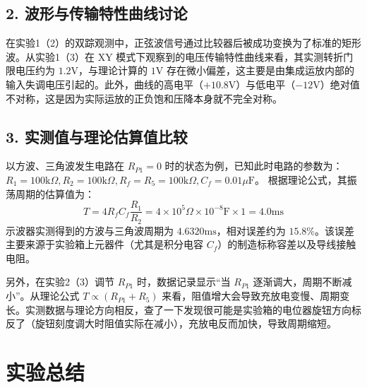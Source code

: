 \documentclass[10.5pt]{config}
\begin{document}
\subsection*{2. 波形与传输特性曲线讨论}
在实验1（2）的双踪观测中，正弦波信号通过比较器后被成功变换为了标准的矩形波。从实验1（3）在 XY 模式下观察到的电压传输特性曲线来看，其实测转折门限电压约为 $1.2\text{V}$，与理论计算的 $1\text{V}$ 存在微小偏差，这主要是由集成运放内部的输入失调电压引起的。此外，曲线的高电平（$+10.8\text{V}$）与低电平（$-12\text{V}$）绝对值不对称，这是因为实际运放的正负饱和压降本身就不完全对称。

\subsection*{3. 实测值与理论估算值比较}
以方波、三角波发生电路在 $R_{P1}=0$ 时的状态为例，已知此时电路的参数为：$R_1=100\text{k}\Omega, R_2=100\text{k}\Omega, R_f = R_5 = 100\text{k}\Omega, C_f = 0.01\mu\text{F}$。
根据理论公式，其振荡周期的估算值为：
\begin{equation*}
    T = 4R_f C_f \frac{R_1}{R_2} = 4 \times 10^5\Omega \times 10^{-8}\text{F} \times 1 = 4.0\text{ms}
\end{equation*}
示波器实测得到的方波与三角波周期为 $4.6320\text{ms}$，相对误差约为 $15.8\%$。该误差主要来源于实验箱上元器件（尤其是积分电容 $C_f$）的制造标称容差以及导线接触电阻。

另外，在实验2（3）调节 $R_{P1}$ 时，数据记录显示“当 $R_{P1}$ 逐渐调大，周期不断减小”。从理论公式 $T \propto (R_{P1}+R_5)$ 来看，阻值增大会导致充放电变慢、周期变长。实测数据与理论方向相反，查了一下发现很可能是实验箱的电位器旋钮方向标反了（旋钮刻度调大时阻值实际在减小），充放电反而加快，导致周期缩短。


\section{实验总结}
\end{document}
